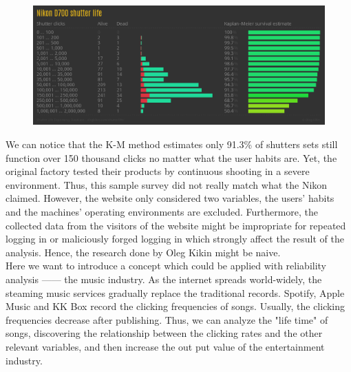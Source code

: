 \documentclass[paper=a4, fontsize=11pt]{scrartcl} %
\numberwithin{equation}{section} %
\numberwithin{figure}{section} %
\numberwithin{table}{section} %
\begin{document}
\begin{figure}[h] %
   \centering
   \includegraphics[width=5.78in]{D700.png} 
\end{figure}

\qquad We can notice that the K-M method estimates only 91.3\% of shutters sets still function over 150 thousand clicks no matter what the user habits are. Yet, the original factory tested their products by continuous shooting in a severe environment. Thus, this sample survey did not really match what the Nikon claimed. However, the website only considered two variables, the users' habits and the machines' operating environments are excluded. Furthermore, the collected data from the visitors of the website might be impropriate for repeated logging in or maliciously forged logging in which strongly affect the result of the analysis. Hence, the research done by Oleg Kikin might be naive. \\

\qquad Here we want to introduce a concept which could be applied with reliability analysis ------ the music industry. As the internet spreads world-widely, the steaming music services gradually replace the traditional records. Spotify, Apple Music and KK Box record the clicking frequencies of songs. Usually, the clicking frequencies decrease after publishing. Thus, we can analyze the "life time" of songs, discovering the relationship between the clicking rates and the other relevant variables, and then increase the out put value of the entertainment industry.
\end{document}
